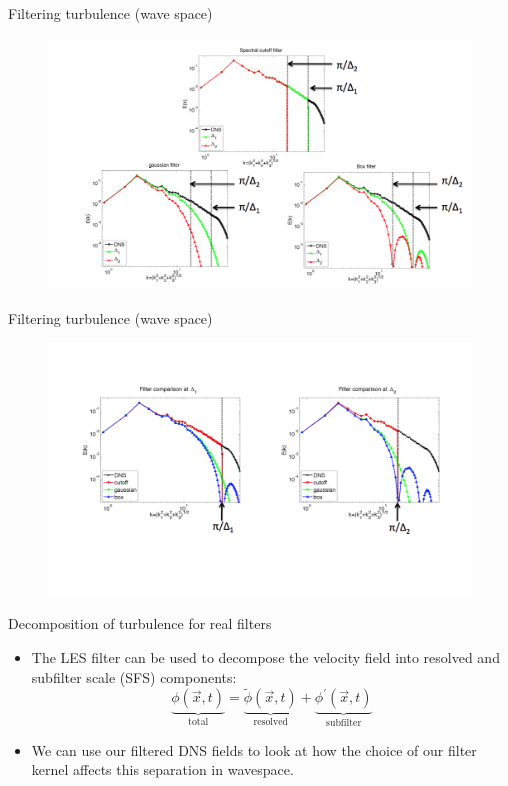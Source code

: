 \begin{frame}{Filtering turbulence (wave space)}
\begin{figure}
	\includegraphics[width=1\textwidth]{filter_wave1.png}
\end{figure}
\end{frame}
\begin{frame}{Filtering turbulence (wave space)}
\begin{figure}
	\includegraphics[width=1\textwidth]{filter_wave2.png}
\end{figure}
\end{frame}
\begin{frame}{Decomposition of turbulence for real filters}

\begin{itemize}
	\item The LES filter can be used to decompose the velocity field into resolved and subfilter scale (SFS) components:
	$$\underbrace{\phi(\vec{x},t)}_{\text{total}} = \underbrace{\tilde \phi (\vec{x},t)}_{\text{resolved}} + \underbrace{\phi^{\prime}(\vec{x},t)}_{\text{subfilter}}$$
	\item We can use our filtered DNS fields to look at how the choice of our filter kernel affects this separation in wavespace.
\end{itemize}
\end{frame}
